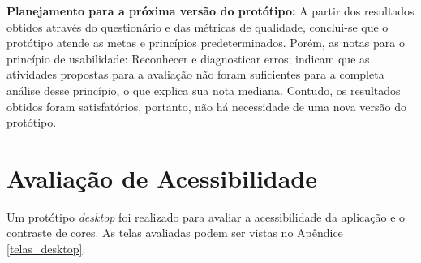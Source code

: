   \textbf{Planejamento para a próxima versão do protótipo:}
  A partir dos resultados obtidos através do questionário e das métricas de qualidade, conclui-se que o protótipo atende as metas
  e princípios predeterminados. Porém, as notas para o princípio de usabilidade: Reconhecer e diagnosticar erros; indicam que as atividades
  propostas para a avaliação não foram suficientes para a completa análise desse princípio, o que explica sua nota mediana. Contudo, os
  resultados obtidos foram satisfatórios, portanto, não há necessidade de uma nova versão do protótipo.

  \vfill
  \pagebreak
\section{Avaliação de Acessibilidade}
Um protótipo \textit{desktop} foi realizado para avaliar a acessibilidade da aplicação e o contraste de cores. As telas avaliadas
podem ser vistas no Apêndice \ref{telas_desktop}.
